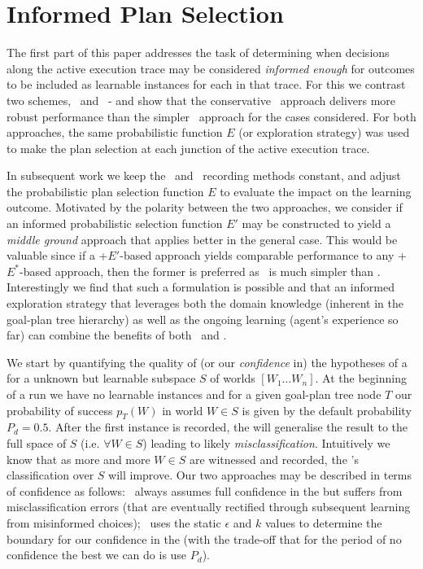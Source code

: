 \section{Informed Plan Selection}\label{sec:coverage-intro}

The first part of this paper addresses the task of determining when decisions along the active execution trace may be considered \textit{informed enough} for outcomes to be included as learnable instances for each \dt in that trace. For this we contrast two schemes, \CL\ and \BUL\ - and show that the conservative \BUL\ approach delivers more robust performance than the simpler \CL\ approach for the cases considered. For both approaches, the same probabilistic function $E$ (or exploration strategy) was used to make the plan selection at each junction of the active execution trace.

In subsequent work we keep the \CL\ and \BUL\ recording methods constant, and adjust the probabilistic plan selection function $E$ to evaluate the impact on the learning outcome. Motivated by the polarity between the two approaches, we consider if an informed probabilistic selection function $E'$ may be constructed to yield a \textit{middle ground} approach that applies better in the general case. This would be valuable since if a \CL+$E'$-based approach yields comparable performance to any \BUL+$E^*$-based approach, then the former is preferred as \CL\ is much simpler than \BUL. Interestingly we find that such a formulation is possible and that an informed exploration strategy that leverages both the domain knowledge (inherent in the goal-plan tree hierarchy) as well as the ongoing learning (agent's experience so far) can combine the benefits of both \CL\ and \BUL.

We start by quantifying the quality of (or our \textit{confidence} in) the hypotheses of a \dt for a unknown but learnable subspace $S$ of worlds $[W_1 \ldots W_n]$. At the beginning of a run we have no learnable instances and for a given goal-plan tree node $T$ our probability of success $p_T(W)$ in world $W \in S$ is given by the default probability $P_d=0.5$. After the first instance is recorded, the \dt will generalise the result to the full space of $S$ (i.e. $\forall W \in S$) leading to likely \textit{misclassification}. Intuitively we know that as more and more $W \in S$ are witnessed and recorded, the \dt's classification over $S$ will improve. Our two approaches may be described in terms of confidence as follows: \CL\ always assumes full confidence in the \dt but suffers from misclassification errors (that are eventually rectified through subsequent learning from misinformed choices); \BUL\ uses the static $\epsilon$ and $k$ values to determine the boundary for our confidence in the \dt (with the trade-off that for the period of no confidence the best we can do is use $P_d$).

